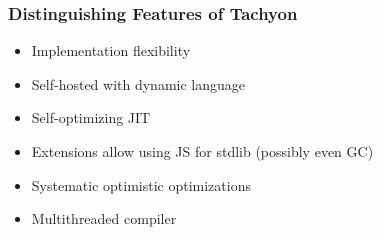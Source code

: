 \begin{frame}
\frametitle{\bf Distinguishing Features of Tachyon}
    \begin{itemize}
        \item Implementation flexibility
        \item Self-hosted with dynamic language
        \item Self-optimizing JIT
        \item Extensions allow using JS for stdlib (possibly even GC)
        \item Systematic optimistic optimizations
        \item Multithreaded compiler
    \end{itemize}
\end{frame}

